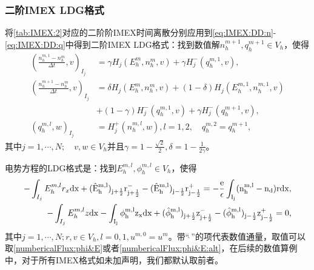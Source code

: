\subsubsection{二阶IMEX LDG格式}


将\autoref{tab:IMEX:2}对应的二阶阶IMEX时间离散分别应用到\eqref{eq:IMEX:DD:n}-\eqref{eq:IMEX:DD:q}中得到二阶IMEX LDG格式：找到数值解$n_h^{m+1},q_h^{m+1}\in V_h$，使得
\begin{align}
    (\frac{n_h^{m,1} -n_h^m}{\Delta t},v)_{I_j} & = \gamma H_j(E_h^m,n_h^m,v) + \gamma H_j^-(q_h^{m,1},v),              \label{eq:IMEX:2:first} \\
    (\frac{n_h^{m+1} -n_h^m}{\Delta t},v)_{I_j} & = \delta H_j(E_h^m,n_h^m,v) + (1-\delta)H_j(E_h^{m,1},n_h^{m,1},v) \nonumber                  \\
                                                & +(1-\gamma)H_j^-(q_h^{m,1},v) + \gamma H_j^-(q_h^{m+1},v),                                    \\
    (q_h^{m,l},w)_{I_j}                         & = H_j^+(n_h^{m,l},w), l = 1,2, \quad q_h^{m,2} = q_h^{m+1},
\end{align}
其中$j = 1,\cdots,N;\quad v,w \in V_h$并且$\gamma = 1- \frac{\sqrt{2}}{2},\delta = 1 - \frac{1}{2\gamma}$。

电势方程的LDG格式是：找到$E_h^{m,l},\phi_h^{m,l} \in V_h$，使得
\begin{align}
    -\int_{I_j} E_h^{m,l}r_x \rm{d}x + (\hat{E}_h^{m,l})_{j+\frac{1}{2}}r_{j+\frac{1}{2}}^- - (\hat{E}_h^{m,l})_{j-\frac{1}{2}}r_{j-\frac{1}{2}}^+ = -\frac{e}{\epsilon}\int_{I_j}(n_h^{m,l} - n_d) r\rm{d} x, \\
    -\int_{I_j} E_h^{m,l}z \rm{d}x - \int_{I_j} \phi_h^{m,l}z_x \rm{d}x  + (\hat{\phi}_h^{m,l})_{j+\frac{1}{2}}z^-_{j+\frac{1}{2}} - (\hat{\phi}_h^{m,l})_{j-\frac{1}{2}}z_{j-\frac{1}{2}}^+  = 0, \label{eq:IMEX:2:last}
\end{align}
其中$j = 1,\cdots,N; r,v \in V_h, l = 0,1, u^{m,0} = u^m$。带“$\widehat{\ }$”的项代表数值通量，取值可以取\eqref{numbericalFlux:phi&E}或者\eqref{numbericalFlux:phi&E:alt}，在后续的数值算例中，对于所有IMEX格式如未加声明，我们都默认取前者。

